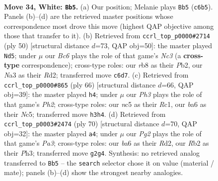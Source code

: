\documentclass[11pt]{article}
\begin{document}
\clearpage

\begin{figure}[p]\centering
\begin{subfigure}{0.46\textwidth}\centering
\resizebox{\linewidth}{!}{%
\newchessgame
\chessboard[
  setfen={1rr5/p4p1k/bpB1p1pp/2n5/2P5/N1B1P2P/PR3PP1/5K1R w - - 13 34},
  showmover=false,
  pgfstyle=straightmove, color=movearrow, markmove={c6-b5}
]}
\caption{}
\end{subfigure}\hfill
\begin{subfigure}{0.46\textwidth}\centering
\resizebox{\linewidth}{!}{%
\newchessgame
\chessboard[
  setfen={3rr1k1/pp4pp/1n1P1b2/5P2/2p2B2/2N5/PP1R3P/5R1K w - - 5 26},
  showmover=false,
  pgfstyle=straightmove, color=movearrow, markmove={c3-d5}
]}
\caption{}
\end{subfigure}
\\[4pt]
\begin{subfigure}{0.46\textwidth}\centering
\resizebox{\linewidth}{!}{%
\newchessgame
\chessboard[
  setfen={r2rb3/4kp2/1np1p2p/p1N3p1/2BP4/1P3P2/P2RK1PP/2R5 w - - 3 34},
  showmover=false,
  pgfstyle=straightmove, color=movearrow, markmove={h2-h4}
]}
\caption{}
\end{subfigure}\hfill
\begin{subfigure}{0.46\textwidth}\centering
\resizebox{\linewidth}{!}{%
\newchessgame
\chessboard[
  setfen={3rrb2/1p3k2/p1b2p2/3p2pp/8/PPP1B2P/2NR1PP1/1R4K1 w - - 1 36},
  showmover=false,
  pgfstyle=straightmove, color=movearrow, markmove={a3-a4}
]}
\caption{}
\end{subfigure}
\caption{\textbf{Move 34, White: \texttt{Bb5}.} (a) Our position; Melanie plays \texttt{Bb5} (\texttt{c6b5}). Panels (b)--(d) are the retrieved master positions whose correspondence most drove this move (highest QAP objective among those that transfer to it). (b) Retrieved from \texttt{ccrl\_top\_p0000\#2714} (ply 50) [structural distance $d$=73, QAP obj=50]: the master played \texttt{Nd5}; under $\mu$ our \emph{Bc6} plays the role of that game's \emph{Nc3} (a \textbf{cross-type} correspondence); cross-type roles: our \emph{r}b8 as their \emph{P}b2, our \emph{N}a3 as their \emph{R}d2; transferred move \texttt{c6d7}. (c) Retrieved from \texttt{ccrl\_top\_p0000\#865} (ply 66) [structural distance $d$=66, QAP obj=39]: the master played \texttt{h4}; under $\mu$ our \emph{Ph3} plays the role of that game's \emph{Ph2}; cross-type roles: our \emph{n}c5 as their \emph{R}c1, our \emph{b}a6 as their \emph{N}c5; transferred move \texttt{h3h4}. (d) Retrieved from \texttt{ccrl\_top\_p0003\#2474} (ply 70) [structural distance $d$=70, QAP obj=32]: the master played \texttt{a4}; under $\mu$ our \emph{Pg2} plays the role of that game's \emph{Pa3}; cross-type roles: our \emph{b}a6 as their \emph{R}d2, our \emph{R}b2 as their \emph{P}h3; transferred move \texttt{g2g4}. Synthesis: no retrieved analog transferred to \texttt{Bb5} -- the \texttt{search} selector chose it on value (material / mate); panels (b)--(d) show the strongest nearby analogies.}
\label{fig:thought-m66}
\end{figure}
\end{document}
